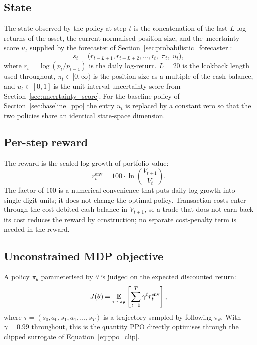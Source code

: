 \subsection{State}
\label{sec:state}

The state observed by the policy at step $t$ is the concatenation of the last $L$ log-returns of the asset, the current normalised position size, and the uncertainty score $u_t$ supplied by the forecaster of Section~\ref{sec:probabilistic_forecaster}:
\begin{equation}
  \label{eq:state}
  s_t = \bigl( r_{t-L+1}, r_{t-L+2}, \ldots, r_t, \; \pi_t, \; u_t \bigr),
\end{equation}
where $r_t = \log(p_t / p_{t-1})$ is the daily log-return, $L = 20$ is the lookback length used throughout, $\pi_t \in [0, \infty)$ is the position size as a multiple of the cash balance, and $u_t \in [0, 1]$ is the unit-interval uncertainty score from Section~\ref{sec:uncertainty_score}. For the baseline policy of Section~\ref{sec:baseline_ppo} the entry $u_t$ is replaced by a constant zero so that the two policies share an identical state-space dimension.

\subsection{Per-step reward}
\label{sec:reward}

The reward is the scaled log-growth of portfolio value:
\begin{equation}
  \label{eq:reward}
  r^{\mathrm{env}}_t = 100 \cdot \ln\!\left( \frac{V_{t+1}}{V_t} \right).
\end{equation}
The factor of 100 is a numerical convenience that puts daily log-growth into single-digit units; it does not change the optimal policy. Transaction costs enter through the cost-debited cash balance in $V_{t+1}$, so a trade that does not earn back its cost reduces the reward by construction; no separate cost-penalty term is needed in the reward.

\subsection{Unconstrained MDP objective}
\label{sec:unconstrained_objective}

A policy $\pi_\theta$ parameterised by $\theta$ is judged on the expected discounted return:
\begin{equation}
  \label{eq:mdp_objective}
  J(\theta) = \operatorname*{\mathbb{E}}_{\tau \sim \pi_\theta} \left[ \sum_{t=0}^{T} \gamma^t r^{\mathrm{env}}_t \right],
\end{equation}
where $\tau = (s_0, a_0, s_1, a_1, \ldots, s_T)$ is a trajectory sampled by following $\pi_\theta$. With $\gamma = 0.99$ throughout, this is the quantity PPO directly optimises through the clipped surrogate of Equation~\ref{eq:ppo_clip}.

